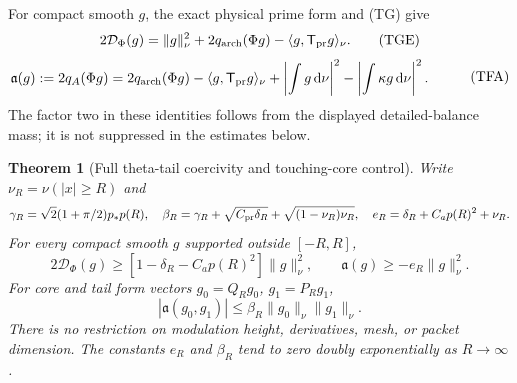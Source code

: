 \documentclass[11pt]{article}
\newtheorem{theorem}{Theorem}
\theoremstyle{remark}\newtheorem{remark}[theorem]{Remark}
\newcommand{\dd}{\,\mathrm d}
\begin{document}
For compact smooth $g$, the exact physical prime form and (TG) give
\[
 2\mathcal D_\Phi(g)=\|g\|_\nu^2
        +2q_{\rm arch}(\Phi g)
                   -\langle g,\mathsf T_{\rm pr}g\rangle_\nu.\tag{TGE}
\]
\[
\begin{split}
 \mathfrak a(g):=2q_A(\Phi g)
    &=2q_{\rm arch}(\Phi g)
        -\langle g,\mathsf T_{\rm pr}g\rangle_\nu
        +\left|\int g\dd\nu\right|^2
        -\left|\int\kappa g\dd\nu\right|^2.
\end{split}                                                \tag{TFA}
\]
The factor two in these identities follows from the displayed
detailed-balance mass; it is not suppressed in the estimates below.

\begin{theorem}[Full theta-tail coercivity and touching-core control]
\label{thm:theta-tail-cross}
Write $\nu_R=\nu(|x|\ge R)$ and
\[
 \gamma_R=\sqrt2(1+\pi/2)p_*p(R),\quad
 \beta_R=\gamma_R+\sqrt{C_{\rm pr}\delta_R}
                     +\sqrt{(1-\nu_R)\nu_R},\quad
 e_R=\delta_R+C_ap(R)^2+\nu_R.
\]
For every compact smooth $g$ supported outside $[-R,R]$,
\[
 2\mathcal D_\Phi(g)\ge
        [1-\delta_R-C_ap(R)^2]\|g\|_\nu^2,\qquad
 \mathfrak a(g)\ge-e_R\|g\|_\nu^2.                       \tag{TTC}
\]
For core and tail form vectors $g_0=Q_Rg_0$, $g_1=P_Rg_1$,
\[
 |\mathfrak a(g_0,g_1)|\le\beta_R\|g_0\|_\nu\|g_1\|_\nu.
                                                               \tag{TCX}
\]
There is no restriction on modulation height, derivatives, mesh,
or packet dimension. The constants $e_R$ and $\beta_R$ tend to
zero doubly exponentially as $R\to\infty$.
\end{theorem}
\end{document}

